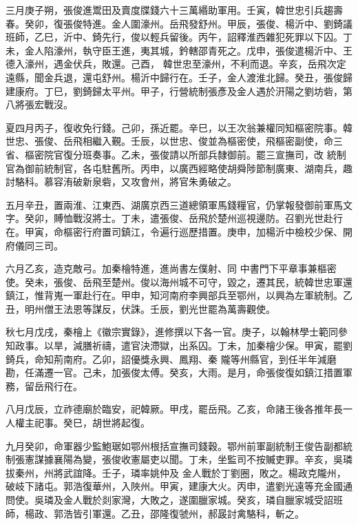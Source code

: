 \begin{pinyinscope}
 三月庚子朔，張俊進鬻田及賣度牒錢六十三萬緡助軍用。壬寅，韓世忠引兵趨壽春。癸卯，復張俊特進。金人圍濠州。岳飛發舒州。甲辰，張俊、楊沂中、劉錡議班師，乙巳，沂中、錡先行，俊以輕兵留後。丙午，詔釋淮西雜犯死罪以下囚。丁未，金人陷濠州，執守臣王進，夷其城，鈐轄邵青死之。戊申，張俊遣楊沂中、王德入濠州，遇金伏兵，敗還。己酉，
 韓世忠至濠州，不利而退。辛亥，岳飛次定遠縣，聞金兵退，還屯舒州。楊沂中歸行在。壬子，金人渡淮北歸。癸丑，張俊歸建康府。丁巳，劉錡歸太平州。甲子，行營統制張彥及金人遇於汧陽之劉坊砦，第八將張宏戰沒。



 夏四月丙子，復收免行錢。己卯，孫近罷。辛巳，以王次翁兼權同知樞密院事。韓世忠、張俊、岳飛相繼入覲。壬辰，以世忠、俊並為樞密使，飛樞密副使，命三省、樞密院官復分班奏事。乙未，張俊請以所部兵隸御前。罷三宣撫司，改
 統制官為御前統制官，各屯駐舊所。丙申，以廣西經略使胡舜陟節制廣東、湖南兵，趣討駱科。慕容洧破新泉砦，又攻會州，將官朱勇破之。



 五月辛丑，置兩淮、江東西、湖廣京西三道總領軍馬錢糧官，仍掌報發御前軍馬文字。癸卯，賻恤戰沒將士。丁未，遣張俊、岳飛於楚州巡視邊防。召劉光世赴行在。甲寅，命樞密行府置司鎮江，令遍行巡歷措置。庚申，加楊沂中檢校少保、開府儀同三司。



 六月乙亥，造克敵弓。加秦檜特進，進尚書左僕射、同
 中書門下平章事兼樞密使。癸未，張俊、岳飛至楚州。俊以海州城不可守，毀之，遷其民，統韓世忠軍還鎮江，惟背嵬一軍赴行在。甲申，知河南府李興部兵至鄂州，以興為左軍統制。乙丑，明州僧王法恩等謀反，伏誅。壬辰，劉光世罷為萬壽觀使。



 秋七月戊戌，秦檜上《徽宗實錄》，進修撰以下各一官。庚子，以翰林學士範同參知政事。以旱，減膳祈禱，遣官決滯獄，出系囚。丁未，加秦檜少保。甲寅，罷劉錡兵，命知荊南府。乙卯，詔優獎永興、鳳翔、秦
 隴等州縣官，到任半年減磨勘，任滿遷一官。己未，加張俊太傅。癸亥，大雨。是月，命張俊復如鎮江措置軍務，留岳飛行在。



 八月戊辰，立祚德廟於臨安，祀韓厥。甲戌，罷岳飛。乙亥，命諸王後各推年長一人權主祀事。癸巳，胡世將起復。



 九月癸卯，命軍器少監鮑琚如鄂州根括宣撫司錢穀。鄂州前軍副統制王俊告副都統制張憲謀據襄陽為變，張俊收憲屬吏以聞。丁未，坐監司不按贓吏罪。辛亥，吳璘拔秦州，州將武誼降。壬子，璘率姚仲及
 金人戰於丁劉圈，敗之。楊政克隴州，破岐下諸屯。郭浩復華州，入陜州。甲寅，建康大火。丙申，遣劉光遠等充金國通問使。吳璘及金人戰於剡家灣，大敗之，遂圍臘家城。癸亥，璘自臘家城受詔班師，楊政、郭浩皆引軍還。乙丑，邵隆復虢州，郝晸討禽駱科，斬之。




\end{pinyinscope}
